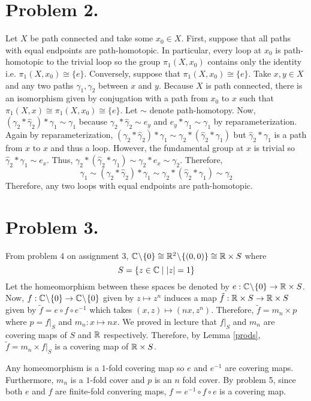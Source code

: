 \documentclass[12pt]{extarticle}
\theoremstyle{remark}
\begin{document}
\section*{Problem 2.}
Let $X$ be path connected and take some $x_0 \in X$. First, suppose that all paths with equal endpoints are path-homotopic. In particular, every loop at $x_0$ is path-homotopic to the trivial loop so the group $\pi_1(X, x_0)$ contains only the identity i.e. $\pi_1(X, x_0) \cong \{e\}$. Conversely, suppose that $\pi_1(X, x_0) \cong \{e\}$. Take $x, y \in X$ and any two paths $\gamma_1, \gamma_2$ between $x$ and $y$. Because $X$ is path connected, there is an isomorphism given by conjugation with a path from $x_0$ to $x$ such that $\pi_1(X, x) \cong \pi_1(X, x_0) \cong \{e\}$. Let $\sim$ denote path-homotopy. Now, $(\gamma_2 * \hat{\gamma}_2) * \gamma_1  \sim \gamma_1$ because $\gamma_2 * \hat{\gamma}_2 \sim e_y$ and $e_y * \gamma_1 \sim \gamma_1$ by reparameterization. Again by reparameterization, $(\gamma_2 * \hat{\gamma}_2) * \gamma_1  \sim \gamma_2 * (\hat{\gamma}_2 * \gamma_1)$ but $\hat{\gamma}_2 * \gamma_1$ is a path from $x$ to $x$ and thus a loop. However, the fundamental group at $x$ is trivial so $\hat{\gamma}_2 * \gamma_1 \sim e_x$. Thus, $\gamma_2 * (\hat{\gamma}_2 * \gamma_1) \sim \gamma_2 * e_x \sim \gamma_2$. Therefore, \[\gamma_1 \sim (\gamma_2 * \hat{\gamma}_2) * \gamma_1  \sim \gamma_2 * (\hat{\gamma}_2 * \gamma_1) \sim \gamma_2\]
Therefore, any two loops with equal endpoints are path-homotopic. 

\section*{Problem 3.}

From problem 4 on assignment 3, $\mathbb{C} \! \setminus \! \{0\} \cong \mathbb{R}^2 \! \setminus \! \{(0,0)\} \cong \mathbb{R} \times S$ where \[S = \{z \in \mathbb{C} \mid |z| = 1\}\]
Let the homeomorphism between these spaces be denoted by $e : \mathbb{C} \! \setminus \! \{0\} \to \mathbb{R} \times S$. \bigskip \\
Now, $f : \mathbb{C} \! \setminus \! \{0\} \to \mathbb{C} \! \setminus \! \{0\}$ given by $z \mapsto z^n$ induces a map $\tilde{f} : \mathbb{R} \times S \to \mathbb{R} \times S$ given by $\tilde{f} = e \circ f \circ e^{-1}$ which takes $(x, z) \mapsto (nx, z^n)$. Therefore, $\tilde{f} = m_n \times p$ where $p = f|_S$ and $m_n : x \mapsto nx$. We proved in lecture that $f|_S$ and $m_n$ are covering maps of $S$ and $\mathbb{R}$ respectively. Therefore, by Lemma \ref{prods}, $\tilde{f} = m_n \times f|_S$ is a covering map of $\mathbb{R} \times S$. 

\begin{center}
\end{center}
Any homeomorphism is a $1$-fold covering map so $e$ and $e^{-1}$ are covering maps. Furthermore, $m_n$ is a $1$-fold cover and $p$ is an $n$ fold cover. By problem 5, since both $e$ and $f$ are finite-fold convering maps, $f = e^{-1} \circ f \circ e$ is a covering map.      
\end{document}
